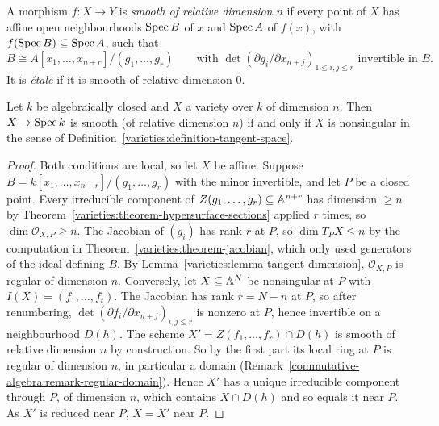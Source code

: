 \begin{definition}\label{schemes:definition-smooth}
A morphism $f \colon X \to Y$ is \emph{smooth of relative dimension $n$} if every point of $X$ has affine open neighbourhoods $\operatorname{Spec} B$ of $x$ and $\operatorname{Spec} A$ of
$f(x)$, with $f(\operatorname{Spec} B) \subseteq \operatorname{Spec} A$, such that
\[
B \cong A[x_1, \ldots, x_{n+r}]/(g_1, \ldots, g_r) \qquad \text{with } \det\left(\partial g_i/\partial x_{n+j}\right)_{1 \leq i,j \leq r} \text{ invertible in } B.
\]
It is \emph{\'etale} if it is smooth of relative dimension $0$.
\end{definition}

\begin{proposition}\label{schemes:proposition-smooth-nonsingular}
Let $k$ be algebraically closed and $X$ a variety over $k$ of dimension $n$. Then $X \to \operatorname{Spec} k$ is smooth (of relative dimension $n$) if and only if $X$
is nonsingular in the sense of Definition~\ref{varieties:definition-tangent-space}.
\end{proposition}

\begin{proof}
Both conditions are local, so let $X$ be affine. Suppose $B = k[x_1, \ldots, x_{n+r}]/(g_1, \ldots, g_r)$ with the minor invertible, and let $P$ be a closed point.
Every irreducible component of $Z(g_1, \ldots, g_r) \subseteq \mathbb{A}^{n+r}$ has dimension $\geq n$ by Theorem~\ref{varieties:theorem-hypersurface-sections} applied $r$
times, so $\dim\mathcal{O}_{X,P} \geq n$. The Jacobian of $(g_i)$ has rank $r$ at $P$, so $\dim T_PX \leq n$ by the computation in
Theorem~\ref{varieties:theorem-jacobian}, which only used generators of the ideal defining $B$. By Lemma~\ref{varieties:lemma-tangent-dimension},
$\mathcal{O}_{X,P}$ is regular of dimension $n$. Conversely, let $X \subseteq \mathbb{A}^N$ be nonsingular at $P$ with $I(X) = (f_1, \ldots, f_t)$. The Jacobian has rank
$r = N - n$ at $P$, so after renumbering, $\det(\partial f_i/\partial x_{n+j})_{i,j \leq r}$ is nonzero at $P$, hence invertible on a neighbourhood $D(h)$. The
scheme $X' = Z(f_1, \ldots, f_r) \cap D(h)$ is smooth of relative dimension $n$ by construction. So by the first part its local ring at $P$ is regular of dimension
$n$, in particular a domain (Remark~\ref{commutative-algebra:remark-regular-domain}). Hence $X'$ has a unique irreducible component through $P$, of dimension $n$, which contains
$X \cap D(h)$ and so equals it near $P$. As $X'$ is reduced near $P$, $X = X'$ near $P$.
\end{proof}

